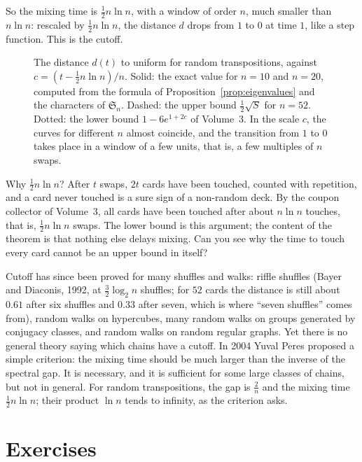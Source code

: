 So the mixing time is $\frac12n\ln n$, with a window of order $n$, much smaller than $n\ln n$: rescaled by $\frac12n\ln n$, the distance $d$ drops from $1$ to $0$ at time $1$, like a step function. This is the cutoff.

\begin{figure}[ht]
\centering
{}
\caption{The distance $d(t)$ to uniform for random transpositions, against $c=(t-\frac12n\ln n)/n$. Solid: the exact value for $n=10$ and $n=20$, computed from the formula of Proposition~\ref{prop:eigenvalues} and the characters of $\mathfrak S_n$. Dashed: the upper bound
$\frac12\sqrt S$ for $n=52$. Dotted: the lower bound $1-6e^{1+2c}$ of Volume~3. In the scale $c$, the curves for different $n$ almost coincide, and the transition from $1$ to $0$ takes place in a window of a few units, that is, a few multiples of $n$ swaps.}
\label{fig:cutoff}
\end{figure}

\begin{think}
Why $\frac12n\ln n$? After $t$ swaps, $2t$ cards have been touched, counted with repetition, and a card never touched is a sure sign of a non-random deck. By the coupon collector of Volume~3, all cards have been touched after about $n\ln n$ touches, that is, $\frac12n\ln n$ swaps.
The lower bound is this argument; the content of the theorem is that nothing else delays mixing. Can you see why the time to touch every card cannot be an upper bound in itself?
\end{think}

\begin{beauty}
Cutoff has since been proved for many shuffles and walks: riffle shuffles (Bayer and Diaconis, 1992, at $\frac32\log_2n$ shuffles; for $52$ cards the distance is still about $0.61$ after six shuffles and $0.33$ after seven, which is where ``seven shuffles'' comes from), random walks on hypercubes, many random walks on groups generated by conjugacy classes, and random walks on random
regular graphs. Yet there is no general theory saying which chains have a cutoff. In 2004 Yuval Peres proposed a simple criterion: the mixing time should be much larger than the inverse of the spectral gap. It is necessary, and it is sufficient for some large classes of
chains, but not in general. For random transpositions, the gap is $\frac2n$ and the mixing time $\frac12n\ln n$; their product $\ln n$ tends to infinity, as the criterion asks.
\end{beauty}

\section{Exercises}

